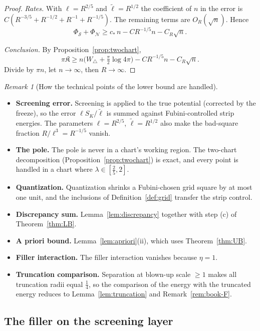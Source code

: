\documentclass[11pt]{article}
\theoremstyle{definition}
\theoremstyle{remark}
\newtheorem{remark}[theorem]{Remark}
\newcommand{\Wtri}{W_{\triangle}}
\begin{document}
\begin{proof}
\emph{Rates.} With $\ell=R^{2/5}$ and $\tilde\ell=R^{1/2}$ the coefficient of $n$ in the error is
$C(R^{-3/5}+R^{-1/2}+R^{-1}+R^{-1/5})$. The remaining terms are $O_R(\sqrt n)$. Hence
\[
\Phi_{\mathcal S}+\Phi_{\mathcal N}\ge c_*\,n-CR^{-1/5}n-C_R\sqrt n .
\]

\emph{Conclusion.} By Proposition~\ref{prop:twochart},
\[
\pi\mathfrak K\ge n\bigl(\Wtri+\tfrac\pi2\log4\pi\bigr)-CR^{-1/5}n-C_R\sqrt n .
\]
Divide by $\pi n$, let $n\to\infty$, then $R\to\infty$.
\end{proof}

\begin{remark}[How the technical points of the lower bound are handled]\label{rem:repairs}
\begin{itemize}[leftmargin=*]
\item \textbf{Screening error.} Screening is applied to the true potential (corrected by the freeze), so the
  error $\ell S_K/\tilde\ell$ is summed against Fubini-controlled strip energies. The parameters
  $\ell=R^{2/5}$, $\tilde\ell=R^{1/2}$ also make the bad-square fraction $R/\ell^3=R^{-1/5}$ vanish.
\item \textbf{The pole.} The pole is never in a chart's working region. The two-chart decomposition
  (Proposition~\ref{prop:twochart}) is exact, and every point is handled in a chart where
  $\lambda\in[\tfrac25,2]$.
\item \textbf{Quantization.} Quantization shrinks a Fubini-chosen grid square by at most one unit, and the
  inclusions of Definition~\ref{def:grid} transfer the strip control.
\item \textbf{Discrepancy sum.} Lemma~\ref{lem:discrepancy} together with step (c) of
  Theorem~\ref{thm:LB}.
\item \textbf{A priori bound.} Lemma~\ref{lem:apriori}(ii), which uses Theorem~\ref{thm:UB}.
\item \textbf{Filler interaction.} The filler interaction vanishes because $\eta=1$.
\item \textbf{Truncation comparison.} Separation at blown-up scale $\ge1$ makes all truncation
  radii equal $\tfrac14$, so the comparison of the energy with the truncated energy reduces to
  Lemma~\ref{lem:truncation} and Remark~\ref{rem:book-F}.
\end{itemize}
\end{remark}

\subsection{The filler on the screening layer}\label{sec:filler}
\end{document}
